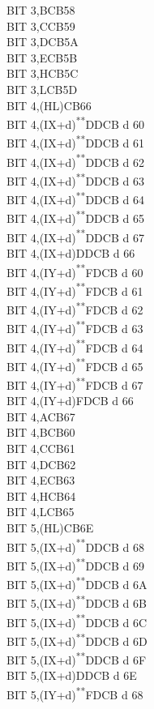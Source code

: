 \documentclass[12pt,twoside,openright,a4paper]{book}
\newcommand{\UNDOC}{\textnormal{\textsuperscript{**}}}
\begin{document}
\begin{multicols}{3}
{\begin{tabbing}
	BIT 3,B\>CB58\\
	BIT 3,C\>CB59\\
	BIT 3,D\>CB5A\\
	BIT 3,E\>CB5B\\
	BIT 3,H\>CB5C\\
	BIT 3,L\>CB5D\\
	BIT 4,(HL)\>CB66\\
	BIT 4,(IX+d)\UNDOC\>DDCB d 60\\
	BIT 4,(IX+d)\UNDOC\>DDCB d 61\\
	BIT 4,(IX+d)\UNDOC\>DDCB d 62\\
	BIT 4,(IX+d)\UNDOC\>DDCB d 63\\
	BIT 4,(IX+d)\UNDOC\>DDCB d 64\\
	BIT 4,(IX+d)\UNDOC\>DDCB d 65\\
	BIT 4,(IX+d)\UNDOC\>DDCB d 67\\
	BIT 4,(IX+d)\>DDCB d 66\\
	BIT 4,(IY+d)\UNDOC\>FDCB d 60\\
	BIT 4,(IY+d)\UNDOC\>FDCB d 61\\
	BIT 4,(IY+d)\UNDOC\>FDCB d 62\\
	BIT 4,(IY+d)\UNDOC\>FDCB d 63\\
	BIT 4,(IY+d)\UNDOC\>FDCB d 64\\
	BIT 4,(IY+d)\UNDOC\>FDCB d 65\\
	BIT 4,(IY+d)\UNDOC\>FDCB d 67\\
	BIT 4,(IY+d)\>FDCB d 66\\
	BIT 4,A\>CB67\\
	BIT 4,B\>CB60\\
	BIT 4,C\>CB61\\
	BIT 4,D\>CB62\\
	BIT 4,E\>CB63\\
	BIT 4,H\>CB64\\
	BIT 4,L\>CB65\\
	BIT 5,(HL)\>CB6E\\
	BIT 5,(IX+d)\UNDOC\>DDCB d 68\\
	BIT 5,(IX+d)\UNDOC\>DDCB d 69\\
	BIT 5,(IX+d)\UNDOC\>DDCB d 6A\\
	BIT 5,(IX+d)\UNDOC\>DDCB d 6B\\
	BIT 5,(IX+d)\UNDOC\>DDCB d 6C\\
	BIT 5,(IX+d)\UNDOC\>DDCB d 6D\\
	BIT 5,(IX+d)\UNDOC\>DDCB d 6F\\
	BIT 5,(IX+d)\>DDCB d 6E\\
	BIT 5,(IY+d)\UNDOC\>FDCB d 68\\

\end{tabbing}}
\end{multicols}
\end{document}
